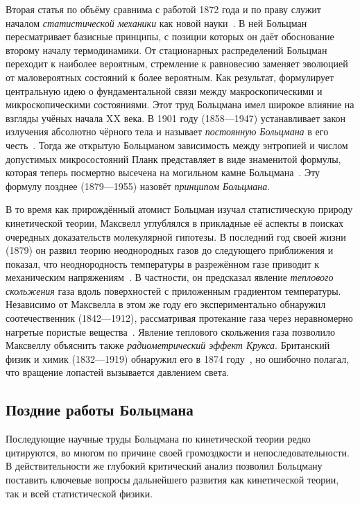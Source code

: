 \documentclass[a4paper, 12pt, oneside]{article} %
\begin{document}
Вторая статья по объёму сравнима с работой 1872 года и по праву служит
началом \emph{статистической механики} как новой
науки~\cite{boltzmann1877stats}. В ней Больцман пересматривает базисные
принципы, с позиции которых он даёт обоснование второму началу
термодинамики. От стационарных распределений Больцман переходит к
наиболее вероятным, стремление к равновесию заменяет эволюцией от
маловероятных состояний к более вероятным.  Как результат, формулирует
центральную идею о фундаментальной связи между макроскопическими и
микроскопическими состояниями. Этот труд Больцмана имел широкое влияние
на взгляды учёных начала XX века. В 1901 году 
(1858---1947) устанавливает закон излучения абсолютно чёрного тела и
называет \emph{постоянную Больцмана} в его
честь~\cite{planck1901constant}. Тогда же открытую Больцманом
зависимость между энтропией и числом допустимых микросостояний Планк
представляет в виде знаменитой формулы, которая теперь посмертно
высечена на могильном камне Больцмана~\cite{planck1901equation}. Эту
формулу позднее  (1879---1955) назовёт
\emph{принципом Больцмана}.

В то время как прирождённый атомист Больцман изучал статистическую
природу кинетической теории, Максвелл углублялся в прикладные её аспекты
в поисках очередных доказательств молекулярной гипотезы. В последний год
своей жизни (1879) он развил теорию неоднородных газов до следующего
приближения и показал, что неоднородность температуры в разрежённом газе
приводит к механическим напряжениям~\cite{maxwell2012stresses}. В
частности, он предсказал явление \emph{теплового скольжения} газа вдоль
поверхностей с приложенным градиентом температуры. Независимо от
Максвелла в этом же году его экспериментально обнаружил соотечественник
 (1842---1912), рассматривая протекание газа
через неравномерно нагретые пористые
вещества~\cite{reynolds1879transpiration}. Явление теплового скольжения
газа позволило Максвеллу объяснить также \emph{радиометрический эффект
Крукса}. Британский физик и химик  (1832---1919)
обнаружил его в 1874 году~\cite{crookes1874attraction}, но ошибочно
полагал, что вращение лопастей вызывается давлением света.

\subsection{Поздние работы Больцмана}

Последующие научные труды Больцмана по кинетической теории редко
цитируются, во многом по причине своей громоздкости и
непоследовательности. В действительности же глубокий критический анализ
позволил Больцману поставить ключевые вопросы дальнейшего развития как
кинетической теории, так и всей статистической физики.
\end{document}
